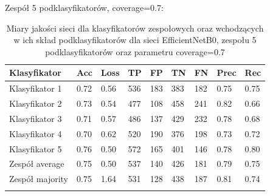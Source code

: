 \documentclass[polish,12pt]{aghthesis}
\begin{document}
\vspace{3mm}
\noindent Zespół 5 podklasyfikatorów, coverage=0.7:
\renewcommand{\arraystretch}{1.75}
 \begin{longtable}[h!]{|m{2.6cm}|m{1.2cm}|m{1.2cm}|m{1.2cm}|m{1.2cm}|m{1.2cm}|m{1.2cm}|m{1.2cm}|m{1.2cm}|}
 \hline
 Klasyfikator & Acc & Loss & TP & FP & TN & FN & Prec & Rec\\
 \hline
 Klasyfikator 1 & 0.72 & 0.56 & 536 & 183 & 383 & 182 & 0.75 & 0.75\\
 \hline
 Klasyfikator 2 & 0.73 & 0.54 & 477 & 108 & 458 & 241 & 0.82 & 0.66\\
 \hline
 Klasyfikator 3 & 0.71 & 0.57 & 486 & 137 & 429 & 232 & 0.78 & 0.68\\
 \hline
 Klasyfikator 4 & 0.70 & 0.62 & 520 & 190 & 376 & 198 & 0.73 & 0.72\\
 \hline
 Klasyfikator 5 & 0.76 & 0.50 & 572 & 165 & 401 & 146 & 0.78 & 0.80\\
 \hline
 Zespół average & 0.75 & 0.50 & 537 & 140 & 426 & 181 & 0.79 & 0.75\\ 
 \hline
 Zespół \newline majority & 0.75 & 1.64 & 531 & 128 & 438 & 187 & 0.81 & 0.74\\
 \hline
\caption{Miary jakości sieci dla klasyfikatorów zespołowych oraz wchodzących w ich skład podklasyfikatorów dla sieci EfficientNetB0, zespołu 5 podklasyfikatorów oraz parametru coverage=0.7}
\label{table:34}
\end{longtable}
\end{document}
